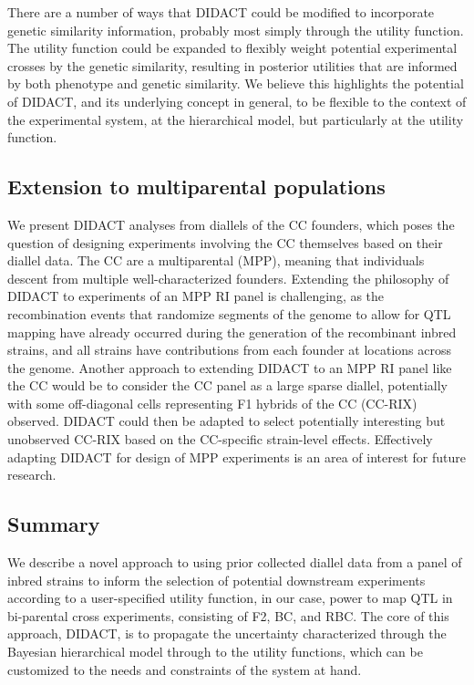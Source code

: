 There are a number of ways that DIDACT could be modified to incorporate genetic similarity information, probably most simply through the utility function. The utility function could be expanded to flexibly weight potential experimental crosses by the genetic similarity, resulting in posterior utilities that are informed by both phenotype and genetic similarity. We believe this highlights the potential of DIDACT, and its underlying concept in general, to be flexible to the context of the experimental system, at the hierarchical model, but particularly at the utility function. 

\subsection{Extension to multiparental populations}

We present DIDACT analyses from diallels of the CC founders, which poses the question of designing experiments involving the CC themselves based on their diallel data. The CC are a multiparental (MPP), meaning that individuals descent from multiple well-characterized founders.  Extending the philosophy of DIDACT to experiments of an MPP RI panel is challenging, as the recombination events that randomize segments of the genome to allow for QTL mapping have already occurred during the generation of the recombinant inbred strains, and all strains have contributions from each founder at locations across the genome. Another approach to extending DIDACT to an MPP RI panel like the CC would be to consider the CC panel as a large sparse diallel, potentially with some off-diagonal cells representing F1 hybrids of the CC (CC-RIX) \citep{Bogue2015} observed. DIDACT could then be adapted to select potentially interesting but unobserved CC-RIX based on the CC-specific strain-level effects. Effectively adapting DIDACT for design of MPP experiments is an area of interest for future research.

\subsection{Summary}

We describe a novel approach to using prior collected diallel data from a panel of inbred strains to inform the selection of potential downstream experiments according to a user-specified utility function, in our case, power to map QTL in bi-parental cross experiments, consisting of F2, BC, and RBC. The core of this approach, DIDACT, is to propagate the uncertainty characterized through the Bayesian hierarchical model through to the utility functions, which can be customized to the needs and constraints of the system at hand.

